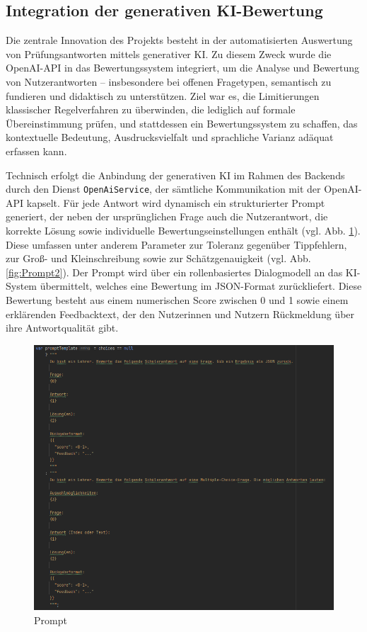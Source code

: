 \documentclass[a4paper,12pt]{article}
\begin{document}
\subsection{Integration der generativen KI-Bewertung}
Die zentrale Innovation des Projekts besteht in der automatisierten Auswertung von Prüfungsantworten mittels generativer KI. Zu diesem Zweck wurde die OpenAI-API in das Bewertungssystem integriert, um die Analyse und Bewertung von Nutzerantworten – insbesondere bei offenen Fragetypen, semantisch zu fundieren und didaktisch zu unterstützen. Ziel war es, die Limitierungen klassischer Regelverfahren zu überwinden, die lediglich auf formale Übereinstimmung prüfen, und stattdessen ein Bewertungssystem zu schaffen, das kontextuelle Bedeutung, Ausdrucksvielfalt und sprachliche Varianz adäquat erfassen kann.

Technisch erfolgt die Anbindung der generativen KI im Rahmen des Backends durch den Dienst \texttt{OpenAiService}, der sämtliche Kommunikation mit der OpenAI-API kapselt. Für jede Antwort wird dynamisch ein strukturierter Prompt generiert, der neben der ursprünglichen Frage auch die Nutzerantwort, die korrekte Lösung sowie individuelle Bewertungseinstellungen enthält (vgl. Abb. \ref{fig:Prompt}). Diese umfassen unter anderem Parameter zur Toleranz gegenüber Tippfehlern, zur Groß- und Kleinschreibung sowie zur Schätzgenauigkeit (vgl. Abb. \ref{fig:Prompt2}). Der Prompt wird über ein rollenbasiertes Dialogmodell an das KI-System übermittelt, welches eine Bewertung im JSON-Format zurückliefert. Diese Bewertung besteht aus einem numerischen Score zwischen 0 und 1 sowie einem erklärenden Feedbacktext, der den Nutzerinnen und Nutzern Rückmeldung über ihre Antwortqualität gibt.

\begin{figure}[H]
    \centering
    \includegraphics[width=1\textwidth]{Bilder/Prompt.png}
    \caption{Prompt}
    \label{fig:Prompt}
\end{figure}
\end{document}
